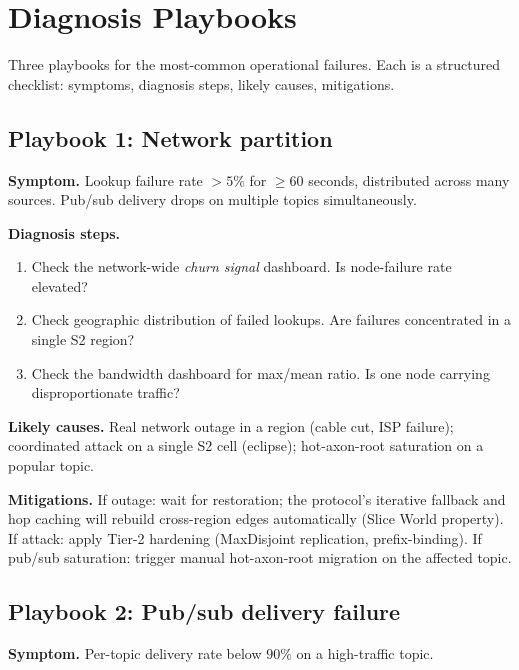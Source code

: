 \documentclass[twoside,nobib]{tufte-book}
\begin{document}
\section{Diagnosis Playbooks}

Three playbooks for the most-common operational failures. Each
is a structured checklist: symptoms, diagnosis steps, likely
causes, mitigations.

\subsection*{Playbook 1: Network partition}
\label{sec:playbook-partition}

\textbf{Symptom.} Lookup failure rate $> 5\%$ for $\geq 60$
seconds, distributed across many sources. Pub/sub delivery
drops on multiple topics simultaneously.

\textbf{Diagnosis steps.}
\begin{enumerate}\setlength\itemsep{0.05em}
  \item Check the network-wide \emph{churn signal} dashboard.
    Is node-failure rate elevated?
  \item Check geographic distribution of failed lookups. Are
    failures concentrated in a single S2 region?
  \item Check the bandwidth dashboard for max/mean ratio. Is
    one node carrying disproportionate traffic?
\end{enumerate}

\textbf{Likely causes.} Real network outage in a region (cable
cut, ISP failure); coordinated attack on a single S2 cell
(eclipse); hot-axon-root saturation on a popular topic.

\textbf{Mitigations.} If outage: wait for restoration; the
protocol's iterative fallback and hop caching will rebuild
cross-region edges automatically (Slice World property).
If attack: apply Tier-2 hardening (MaxDisjoint replication,
prefix-binding). If pub/sub saturation: trigger manual
hot-axon-root migration on the affected topic.

\subsection*{Playbook 2: Pub/sub delivery failure}
\label{sec:playbook-pubsub}

\textbf{Symptom.} Per-topic delivery rate below $90\%$ on a
high-traffic topic.
\end{document}
